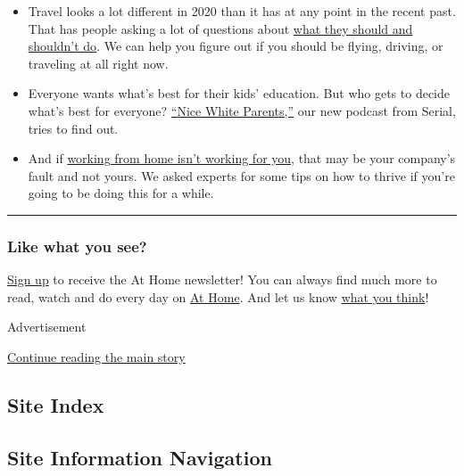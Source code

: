 \begin{itemize}
\item
  Travel looks a lot different in 2020 than it has at any point in the
  recent past. That has people asking a lot of questions about
  \href{https://www.nytimes3xbfgragh.onion/interactive/2020/07/31/travel/coronavirus-travel-risk.html}{what
  they should and shouldn't do}. We can help you figure out if you
  should be flying, driving, or traveling at all right now.
\item
  Everyone wants what's best for their kids' education. But who gets to
  decide what's best for everyone?
  \href{https://www.nytimes3xbfgragh.onion/2020/07/30/podcasts/nice-white-parents-serial.html?action=click\&module=Editors\%20Picks\&pgtype=Homepage}{``Nice
  White Parents,''} our new podcast from Serial, tries to find out.
\item
  And if
  \href{https://www.nytimes3xbfgragh.onion/2020/07/31/upshot/remote-work-tips.html}{working
  from home isn't working for you}, that may be your company's fault and
  not yours. We asked experts for some tips on how to thrive if you're
  going to be doing this for a while.
\end{itemize}

\begin{center}\rule{0.5\linewidth}{\linethickness}\end{center}

\hypertarget{like-what-you-see}{%
\subsubsection{Like what you see?}\label{like-what-you-see}}

\href{https://www.nytimes3xbfgragh.onion/newsletters/at-home}{Sign up}
to receive the At Home newsletter! You can always find much more to
read, watch and do every day on
\href{https://www.nytimes3xbfgragh.onion/spotlight/at-home}{At Home}.
And let us know
\href{https://nyt.qualtrics.com/jfe/form/SV_e9cKGVFtci4CObz}{what you
think}!

Advertisement

\protect\hyperlink{after-bottom}{Continue reading the main story}

\hypertarget{site-index}{%
\subsection{Site Index}\label{site-index}}

\hypertarget{site-information-navigation}{%
\subsection{Site Information
Navigation}\label{site-information-navigation}}

